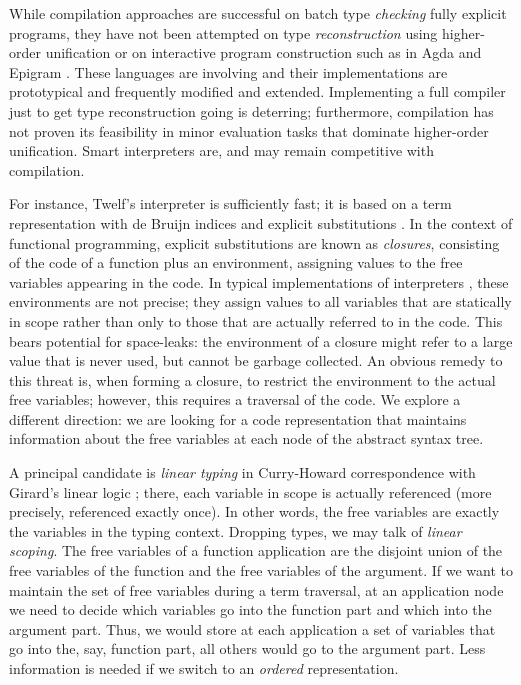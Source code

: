 \documentclass[submission,copyright,creativecommons]{eptcs}
\begin{document}
While compilation approaches are successful on batch type \emph{checking}
fully explicit programs, they have not been attempted on type
\emph{reconstruction} using higher-order unification or on interactive
program construction such as in Agda and Epigram \cite{mcBrideMcKinna:view}.
These languages are involving and their implementations are
prototypical and frequently modified and extended.  Implementing a
full compiler just to get type reconstruction going is deterring;
furthermore, compilation has not proven its feasibility in minor
evaluation tasks that dominate higher-order unification.  Smart
interpreters are, and may remain competitive with compilation.  

For instance, Twelf's interpreter is sufficiently fast; it is 
based on a term representation with de Bruijn indices 
\cite{deBruijn:nameless} and explicit substitutions 
\cite{abadiCardelliCurienLevy:jfp91}.  In the context of functional
programming, explicit substitutions are known as \emph{closures},
consisting of the code of a function plus an environment, assigning
values to the free variables appearing in the code.  
In typical implementations of interpreters \cite{coquand:type}, 
these environments are not
precise; they assign values to all variables that are statically in
scope rather than only to those that are actually referred to in the
code.  This bears potential for space-leaks: the environment of a
closure might refer to a large value that is never used, but cannot be
garbage collected.  An obvious remedy to this threat is, when forming
a closure, to restrict the environment to the actual free variables;
however, this requires a traversal of the code.  We explore a
different direction: we are looking for a code representation that
maintains information about the free variables at each node of the
abstract syntax tree.

A principal candidate is \emph{linear typing} in Curry-Howard
correspondence with Girard's linear logic \cite{girard:linear}; there,
each variable in scope is actually referenced (more precisely,
referenced exactly once).  In other words, the
free variables are exactly the variables in the typing context.
Dropping types, we may talk of \emph{linear scoping}.  The free
variables of a function application are the disjoint union of the free
variables of the function and the free variables of the argument.  If
we want to maintain the set of free variables during a term traversal,
at an application node we need to decide which variables go into the
function part and which into the argument part.  Thus, we would store
at each application a set of variables that go into the, say, function
part, all others would go to the argument part.  Less information is
needed if we switch to an \emph{ordered} representation.
\end{document}

